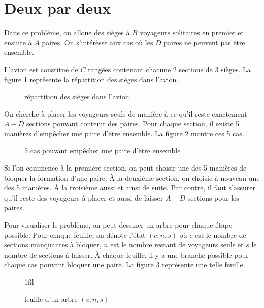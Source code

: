\documentclass[11pt]{article}
\makeatletter
\newcommand*{\centerfloat}{%
    \parindent \z@%
    \leftskip \z@ \@plus 1fil \@minus \textwidth%
    \rightskip\leftskip%
    \parfillskip \z@skip}%
\makeatother
\begin{document}
\def\Sigle{MTH2302A}
\def\Cours{Probabilités et Statistique}
\def\Devoir{Devoir 1}
\def\logoscale{1}
\pagetitre

\section{Deux par deux}
Dans ce problème, on alloue des sièges à $B$ voyageurs solitaires en
premier et ensuite à $A$ paires. On s'intérèsse aux cas où les $D$
paires ne peuvent pas être ensemble.

L'avion est constitué de $C$ rangées contenant chacune 2 sections de
3 sièges. La figure \ref{fig:avion} représente la répartition des sièges
dans l'avion.
\begin{figure}[H]
    \centering
    
    \caption{répartition des sièges dans l'avion}
    \label{fig:avion}
\end{figure}

On cherche à placer les voyageurs seuls de manière à ce qu'il reste exactement
$A-D$ sections pouvant contenir des paires. Pour chaque section, il existe 5
manières d'empêcher une paire d'être ensemble. La figure \ref{fig:avion_solo}
montre ces 5 cas.

\begin{figure}[H]
    \centering
    
    \caption{5 cas pouvant empêcher une paire d'être ensemble}
    \label{fig:avion_solo}
\end{figure}

Si l'on commence à la première section, on peut choisir une des 5 manières de
bloquer la formation d'une paire. À la deuxième section, on choisie à nouveau
une des 5 manières. À la troisième aussi et ainsi de suite. Par contre, il faut
s'assurer qu'il reste des voyageurs à placer et aussi de laisser $A-D$ sections
pour les paires.

Pour visualiser le problème, on peut dessiner un arbre pour chaque étape possible.
Pour chaque feuille, on dénote l'état $(c,n,s)$ où $c$ est le nombre de sections
manquantes à bloquer, $n$ est le nombre restant de voyageurs seuls et $s$ le nombre
de sections à laisser. À chaque feuille, il y a une branche possible pour chaque cas
pouvant bloquer une paire. La figure \ref{fig:avion_arbre_cns} représente une telle
feuille.

\begin{figure}[H]
    \centerfloat
    
    \caption{feuille d'un arbre $(c,n,s)$}
    \label{fig:avion_arbre_cns}
\end{figure}
\end{document}
